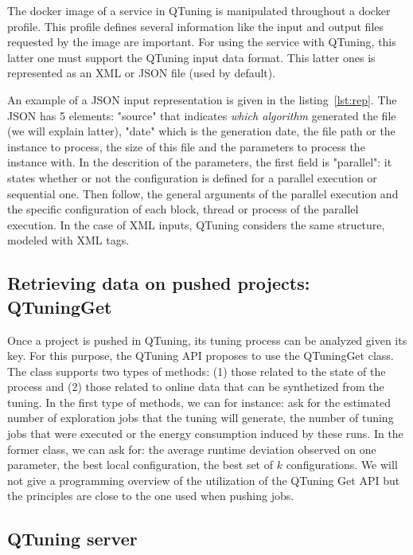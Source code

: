 \documentclass[10pt, conference, compsocconf]{IEEEtran}
\begin{document}
 
The docker image of a service in QTuning is manipulated throughout a docker profile. This profile defines several information like 
the input and output files requested by the image are important. For using the service with QTuning, this latter one must support 
the QTuning input data format. This latter ones is represented as an XML or JSON file (used by default). 

An example of a JSON input representation is given in the listing~\ref{lst:rep}. The JSON has 5 elements: "source" that indicates 
{\it which algorithm} generated the file (we will explain latter), "date" which is the generation date, the file path or the instance to process, 
the size of this file and the parameters to process the instance with. In the descrition of the parameters, the first field is  
"parallel": it states whether or not the configuration is defined for a parallel execution or sequential one. 
Then follow, the general arguments of the parallel execution and the specific configuration of each block, thread or process of 
the parallel execution. In the case of XML inputs, QTuning considers the same structure, modeled with XML tags.  


\subsection{Retrieving  data on pushed projects: QTuningGet}

Once a project is pushed in QTuning, its tuning process can be analyzed given its key. For this purpose, the QTuning 
API proposes to use the QTuningGet class. The class supports two types of methods: (1) those related to the state of the 
process and (2) those related to online data that can be synthetized from the tuning. In the first type of methods, 
we can for instance: ask for the estimated number of exploration jobs that the tuning will generate, the number of tuning 
jobs that were executed or the energy consumption induced by these runs. In the former class, we can ask for: the average runtime 
deviation observed on one parameter, the best local configuration, the best set of $k$ configurations. 
We will not give a programming overview of the utilization of the QTuning Get API but the principles are close to the 
one used when pushing jobs. 


\subsection{QTuning server}
\end{document}
